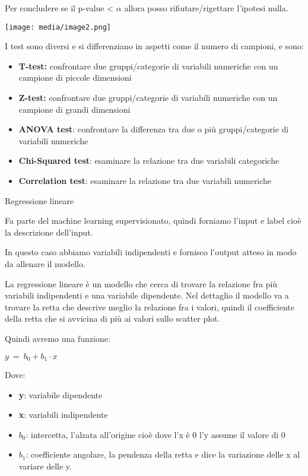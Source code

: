 Per concludere se il p-value \textless{} \(\alpha\) allora posso
rifiutare/rigettare l'ipotesi nulla.

\texttt{[image: media/image2.png]}

I test sono diversi e si differenziano in aspetti come il numero di
campioni, e sono:

\begin{itemize}
\item
  \textbf{T-test:} confrontare due gruppi/categorie di variabili
  numeriche con un campione di piccole dimensioni
\item
  \textbf{Z-test:} confrontare due gruppi/categorie di variabili
  numeriche con un campione di grandi dimensioni
\item
  \textbf{ANOVA test}: confrontare la differenza tra due o più
  gruppi/categorie di variabili numeriche
\item
  \textbf{Chi-Squared test}: esaminare la relazione tra due variabili
  categoriche
\item
  \textbf{Correlation test}: esaminare la relazione tra due variabili
  numeriche
\end{itemize}

Regressione lineare

Fa parte del machine learning supervisionato, quindi forniamo l'input e
label cioè la descrizione dell'input.

In questo caso abbiamo variabili indipendenti e fornisco l'output atteso
in modo da allenare il modello.

La regressione lineare è un modello che cerca di trovare la relazione
fra più variabili indipendenti e una variabile dipendente. Nel dettaglio
il modello va a trovare la retta che descrive meglio la relazione fra i
valori, quindi il coefficiente della retta che si avvicina di più ai
valori sullo scatter plot.

Quindi avremo una funzione:

\(y\  = \ b_{0} + b_{1} \cdot x\)

Dove:

\begin{itemize}
\item
  \textbf{y}: variabile dipendente
\item
  \textbf{x}: variabili indipendente
\item
  \(b_{0}\): intercetta, l'alzata all'origine cioè dove l'x è 0 l'y
  assume il valore di 0
\item
  \(b_{1}\): coefficiente angolare, la pendenza della retta e dice la
  variazione delle x al variare delle y.
\end{itemize}

